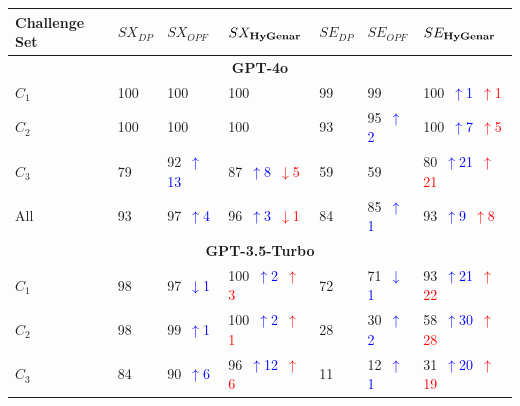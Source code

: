 \begin{table}
\centering
\begin{tabularx}{\textwidth}{l X X X X X X}
\toprule
\textbf{Challenge Set} & \textbf{$SX_{DP}$} & \textbf{$SX_{OPF}$} & \textbf{$SX_{\textbf{HyGenar}}$} & \textbf{$SE_{DP}$} & \textbf{$SE_{OPF}$} & \textbf{$SE_{\textbf{HyGenar}}$} \\
\midrule
\multicolumn{7}{c}{\small\textbf{GPT-4o}} \\
\midrule
$C_1$ 
& 100 
& 100 
& 100 
& 99 
& 99
& 100~\textcolor{blue}{\scriptsize$\uparrow$1}~\textcolor{red}{\scriptsize$\uparrow$1} \\
$C_2$ 
& 100 
& 100 
& 100 
& 93 
& 95~\textcolor{blue}{\scriptsize$\uparrow$2}  
& 100~\textcolor{blue}{\scriptsize$\uparrow$7}~\textcolor{red}{\scriptsize$\uparrow$5} \\
$C_3$ 
& 79 
& 92~\textcolor{blue}{\scriptsize$\uparrow$13}   
& 87~\textcolor{blue}{\scriptsize$\uparrow$8}~\textcolor{red}{\scriptsize$\downarrow$5} 
& 59 
& 59 
& 80~\textcolor{blue}{\scriptsize$\uparrow$21}~\textcolor{red}{\scriptsize$\uparrow$21} \\
All
& 93 
& 97~\textcolor{blue}{\scriptsize$\uparrow$4}   
& 96~\textcolor{blue}{\scriptsize$\uparrow$3}~\textcolor{red}{\scriptsize$\downarrow$1} 
& 84 
& 85~\textcolor{blue}{\scriptsize$\uparrow$1}   
& 93~\textcolor{blue}{\scriptsize$\uparrow$9}~\textcolor{red}{\scriptsize$\uparrow$8} \\
\midrule
\multicolumn{7}{c}{\small\textbf{GPT-3.5-Turbo}} \\
\midrule
$C_1$ 
& 98 
& 97~\textcolor{blue}{\scriptsize$\downarrow$1}   
& 100~\textcolor{blue}{\scriptsize$\uparrow$2}~\textcolor{red}{\scriptsize$\uparrow$3}
& 72 
& 71~\textcolor{blue}{\scriptsize$\downarrow$1}   
& 93~\textcolor{blue}{\scriptsize$\uparrow$21}~\textcolor{red}{\scriptsize$\uparrow$22} \\
$C_2$ 
& 98 
& 99~\textcolor{blue}{\scriptsize$\uparrow$1}   
& 100~\textcolor{blue}{\scriptsize$\uparrow$2}~\textcolor{red}{\scriptsize$\uparrow$1}
& 28 
& 30~\textcolor{blue}{\scriptsize$\uparrow$2}   
& 58~\textcolor{blue}{\scriptsize$\uparrow$30}~\textcolor{red}{\scriptsize$\uparrow$28} \\
$C_3$ 
& 84 
& 90~\textcolor{blue}{\scriptsize$\uparrow$6}   
& 96~\textcolor{blue}{\scriptsize$\uparrow$12}~\textcolor{red}{\scriptsize$\uparrow$6}
& 11 
& 12~\textcolor{blue}{\scriptsize$\uparrow$1}   
& 31~\textcolor{blue}{\scriptsize$\uparrow$20}~\textcolor{red}{\scriptsize$\uparrow$19} \\

\end{tabularx}
\end{table}
